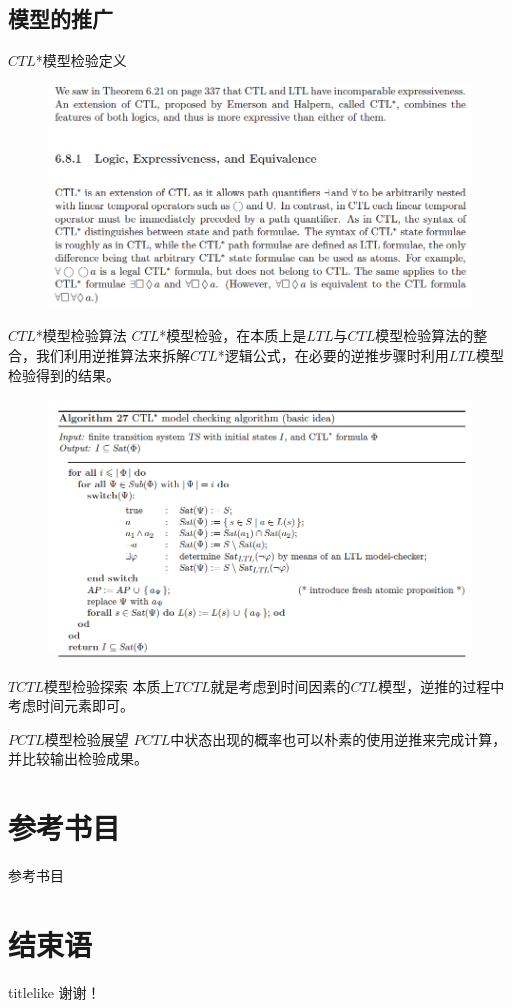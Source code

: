 \documentclass[english]{pkuslide}
\begin{document}
\subsection{模型的推广}
\begin{frame}{$CTL$*模型检验}{定义}
\begin{figure}
\centering
\includegraphics[height=0.5\textheight]{2.png}
\end{figure}
\end{frame}
\begin{frame}{$CTL$*模型检验}{算法}
$CTL$*模型检验，在本质上是$LTL$与$CTL$模型检验算法的整合，我们利用逆推算法来拆解$CTL$*逻辑公式，在必要的逆推步骤时利用$LTL$模型检验得到的结果。
\begin{figure}
\centering
\includegraphics[height=0.5\textheight]{3.png}
\end{figure}
\end{frame}
\begin{frame}{$TCTL$模型检验}{探索}
本质上$TCTL$就是考虑到时间因素的$CTL$模型，逆推的过程中考虑时间元素即可。
\end{frame}
\begin{frame}{$PCTL$模型检验}{展望}
$PCTL$中状态出现的概率也可以朴素的使用逆推来完成计算，并比较输出检验成果。
\end{frame}
\section{参考书目}
\begin{frame}{参考书目}
\printbibliography
\end{frame}
\section{结束语}
\begin{frame}
\LARGE
\begin{beamercolorbox}[center, ht=3em]{titlelike}
\vspace{1em}
谢谢！
\end{beamercolorbox}
\end{frame}
\end{document}
